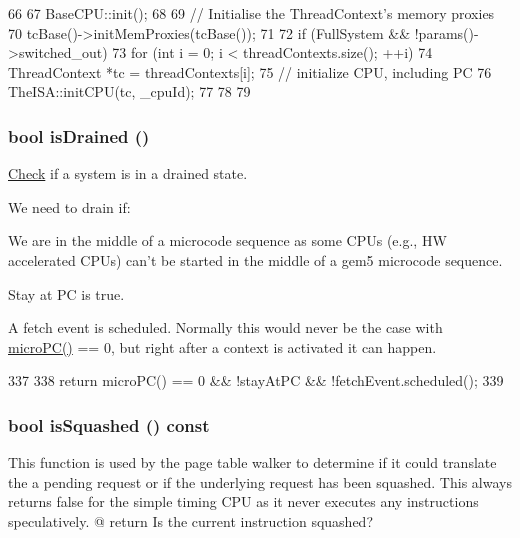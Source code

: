 \begin{DoxyCode}
66 {
67     BaseCPU::init();
68 
69     // Initialise the ThreadContext's memory proxies
70     tcBase()->initMemProxies(tcBase());
71 
72     if (FullSystem && !params()->switched_out) {
73         for (int i = 0; i < threadContexts.size(); ++i) {
74             ThreadContext *tc = threadContexts[i];
75             // initialize CPU, including PC
76             TheISA::initCPU(tc, _cpuId);
77         }
78     }
79 }
\end{DoxyCode}
\hypertarget{classTimingSimpleCPU_ac166e5bc3ddf730beb1282cf821096ae}{
\subsubsection[{isDrained}]{\setlength{\rightskip}{0pt plus 5cm}bool isDrained ()}}
\label{classTimingSimpleCPU_ac166e5bc3ddf730beb1282cf821096ae}
\hyperlink{classCheck}{Check} if a system is in a drained state.

We need to drain if: 
\begin{DoxyItemize}
\item We are in the middle of a microcode sequence as some CPUs (e.g., HW accelerated CPUs) can't be started in the middle of a gem5 microcode sequence.


\item Stay at PC is true.


\item A fetch event is scheduled. Normally this would never be the case with \hyperlink{classBaseSimpleCPU_a1a21696f33a7d38f251687ae0b5e9718}{microPC()} == 0, but right after a context is activated it can happen. 
\end{DoxyItemize}


\begin{DoxyCode}
337                      {
338         return microPC() == 0 && !stayAtPC && !fetchEvent.scheduled();
339     }
\end{DoxyCode}
\hypertarget{classTimingSimpleCPU_add8df091bd836cf92c6987990d130b83}{
\subsubsection[{isSquashed}]{\setlength{\rightskip}{0pt plus 5cm}bool isSquashed () const}}
\label{classTimingSimpleCPU_add8df091bd836cf92c6987990d130b83}
This function is used by the page table walker to determine if it could translate the a pending request or if the underlying request has been squashed. This always returns false for the simple timing CPU as it never executes any instructions speculatively. @ return Is the current instruction squashed? 


